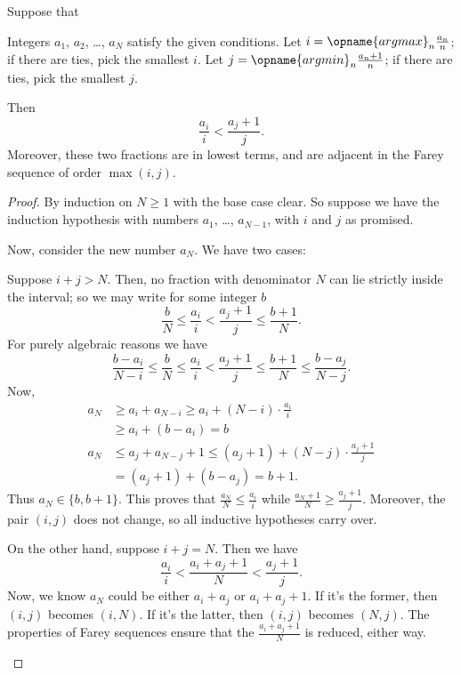 \documentclass[11pt]{scrartcl}
\begin{document}
\begin{claim*}
  Suppose that
  \begin{itemize}
    \ii Integers $a_1$, $a_2$, \dots, $a_N$ satisfy the given conditions.
    \ii Let $i = \opname{argmax}_n \frac{a_n}{n}$;
    if there are ties, pick the smallest $i$.
    \ii Let $j = \opname{argmin}_n \frac{a_n+1}{n}$;
    if there are ties, pick the smallest $j$.
  \end{itemize}
  Then \[ \frac{a_i}{i} < \frac{a_j+1}{j}. \]
  Moreover, these two fractions are in lowest terms,
  and are adjacent in the Farey sequence of order $\max(i,j)$.
\end{claim*}
\begin{proof}
  By induction on $N \ge 1$ with the base case clear.
  So suppose we have the induction hypothesis
  with numbers $a_1$, \dots, $a_{N-1}$,
  with $i$ and $j$ as promised.

  Now, consider the new number $a_N$.
  We have two cases:
  \begin{itemize}
    \ii Suppose $i+j > N$.
    Then, no fraction with denominator $N$
    can lie strictly inside the interval;
    so we may write for some integer $b$
    \[ \frac bN \le \frac{a_i}{i}
      < \frac{a_j+1}{j} \le \frac{b+1}{N}. \]
    For purely algebraic reasons we have
    \[ \frac{b-a_i}{N-i} \le \frac bN \le \frac{a_i}{i}
      < \frac{a_j+1}{j} \le \frac{b+1}{N}
      \le \frac{b-a_j}{N-j}. \]
    Now,
    \begin{align*}
      a_N &\ge a_i + a_{N-i}
        \ge a_i + (N-i) \cdot \frac{a_i}{i} \\
      &\ge a_i + (b-a_i) = b \\
      a_N &\le a_j + a_{N-j} + 1
        \le (a_j+1) + (N-j) \cdot \frac{a_j+1}{j} \\
      &= (a_j+1) + (b-a_j) = b+1.
    \end{align*}
    Thus $a_N \in \{b,b+1\}$.
    This proves that $\frac{a_N}{N} \le \frac{a_i}{i}$
    while $\frac{a_N+1}{N} \ge \frac{a_j+1}{j}$.
    Moreover, the pair $(i,j)$ does not change,
    so all inductive hypotheses carry over.

    \ii On the other hand, suppose $i+j = N$.
    Then we have
    \[ \frac{a_i}{i} < \frac{a_i + a_j + 1}{N} < \frac{a_j+1}{j}.  \]
    Now, we know $a_N$ could be either $a_i + a_j$ or $a_i + a_j + 1$.
    If it's the former, then $(i,j)$ becomes $(i,N)$.
    If it's the latter, then $(i,j)$ becomes $(N,j)$.
    The properties of Farey sequences ensure that
    the $\frac{a_i + a_j + 1}{N}$ is reduced, either way.
  \end{itemize}
\end{proof}
\pagebreak
\end{document}
